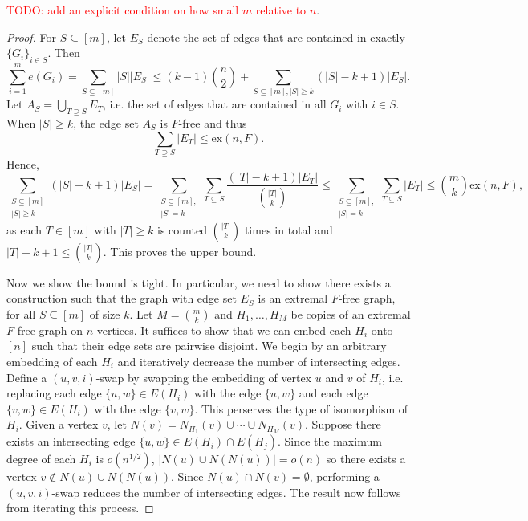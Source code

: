 \documentclass[12pt]{report}
\begin{document}
\textcolor{red}{TODO: add an explicit condition on how small $m$ relative to $n$}.

\begin{proof}
  For $S \subseteq [m]$, let $E_S$ denote the set of edges that are contained in exactly $\{G_i\}_{i
  \in S}$. Then 
  \[
    \sum_{i = 1}^m e(G_i) = \sum_{S \subseteq [m]} |S||E_S| \leq (k - 1)\binom{n}{2} + \sum_{S \subseteq [m], |S| \geq k} (|S| - k + 1)|E_S|.
  \]
  Let $A_S = \bigcup_{T \supseteq S} E_T$, i.e. the set of edges that are contained in all $G_i$
  with $i \in S$. When $|S| \geq k$, the edge set $A_S$ is $F$-free and thus 
  \[
    \sum_{T \supseteq S} |E_T| \leq \text{ex}(n, F).
  \]
  Hence,
  \[
    \sum_{\substack{S \subseteq [m] \\ |S| \geq k}} (|S| - k + 1)|E_S| = \sum_{\substack{S \subseteq [m], \\ |S| = k}} \sum_{T \subseteq S} \frac{(|T| - k + 1)|E_T|}{\binom{|T|}{k}} \leq \sum_{\substack{S \subseteq [m], \\ |S| = k}} \sum_{T \subseteq S} |E_T| \leq \binom{m}{k}\text{ex}(n, F),
  \]
  as each $T \in [m]$ with $|T| \geq k$ is counted $\binom{|T|}{k}$ times in total and $|T| - k + 1
  \leq \binom{|T|}{k}$. This proves the upper bound.

  Now we show the bound is tight. In particular, we need to show there exists a construction such
  that the graph with edge set $E_S$ is an extremal $F$-free graph, for all $S \subseteq [m]$ of
  size $k$. Let $M = \binom{m}{k}$ and $H_1, \ldots, H_M$ be copies of an extremal $F$-free graph on
  $n$ vertices. It suffices to show that we can embed each $H_i$ onto $[n]$ such that their edge
  sets are pairwise disjoint. We begin by an arbitrary embedding of each $H_i$ and iteratively
  decrease the number of intersecting edges. Define a $(u, v, i)$-swap by swapping the embedding of
  vertex $u$ and $v$ of $H_i$, i.e. replacing each edge $\{u, w\} \in E(H_i)$ with the edge $\{u,
  w\}$ and each edge $\{v, w\} \in E(H_i)$ with the edge $\{v, w\}$. This perserves the type of
  isomorphism of $H_i$. Given a vertex $v$, let $N(v) = N_{H_1}(v) \cup \cdots \cup N_{H_M}(v)$.
  Suppose there exists an intersecting edge $\{u, w\} \in E(H_i) \cap E(H_j)$. Since the maximum
  degree of each $H_i$ is $o(n^{1/2})$, $|N(u) \cup N(N(u))| = o(n)$ so there exists a vertex $v
  \notin N(u) \cup N(N(u))$. Since $N(u) \cap N(v) = \emptyset$, performing a $(u, v, i)$-swap
  reduces the number of intersecting edges. The result now follows from iterating this process.
\end{proof}
\end{document}
